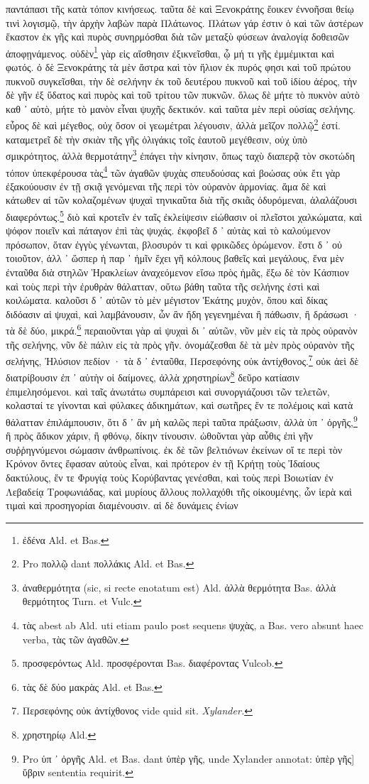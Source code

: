 \documentclass[a4paper, 11pt, oneside, polutonikogreek, german]{article}
\begin{document}
παντάπασι τῆς κατὰ τόπον κινήσεως. ταῦτα δὲ καὶ Ξενοκράτης ἔοικεν ἐννοῆσαι θείῳ τινὶ λογισμῷ, τὴν ἀρχὴν λαβὼν παρὰ Πλάτωνος. Πλάτων γάρ ἐστιν ὁ καὶ τῶν ἀστέρων ἕκαστον ἐκ γῆς καὶ πυρὸς συνηρμόσθαι διὰ τῶν μεταξὺ φύσεων ἀναλογίᾳ δοθεισῶν ἀποφῃνάμενος. οὐδὲν\footnote{ἐδένα Ald. et Bas.} γὰρ εἰς αἴσθησιν ἐξικνεῖσθαι, ᾧ μή τι γῆς ἐμμέμικται καὶ φωτός. ὁ δὲ Ξενοκράτης τὰ μὲν ἄστρα καὶ τὸν ἤλιον ἐκ πυρός φησι καὶ τοῦ πρώτου πυκνοῦ συγκεῖσθαι, τὴν δὲ σελήνην ἐκ τοῦ δευτέρου πυκνοῦ καὶ τοῦ ἰδίου ἀέρος, τὴν δὲ γῆν ἐξ ὕδατος καὶ πυρὸς καὶ τοῦ τρίτου τῶν πυκνῶν. ὅλως δὲ μήτε τὸ πυκνὸν αὐτὸ καθ ᾽ αὑτὸ, μήτε τὸ μανὸν εἶναι ψυχῆς δεκτικόν. καὶ ταῦτα μὲν περὶ οὐσίας σελήνης. εὖρος δὲ καὶ μέγεθος, οὐχ ὅσον οἱ γεωμέτραι λέγουσιν, ἀλλὰ μεῖζον πολλῷ\footnote{Pro πολλῷ dant πολλάκις Ald. et Bas.} ἐστί. καταμετρεῖ δὲ τὴν σκιὰν τῆς γῆς ὀλιγάκις τοῖς ἑαυτοῦ μεγέθεσιν, οὐχ ὑπὸ σμικρότητος, ἀλλὰ θερμοτάτην\footnote{ἀναθερμότητα (sic, si recte enotatum est) Ald. ἀλλὰ θερμότητα Bas. ἀλλὰ θερμότητος Turn. et Vulc.} ἐπάγει τὴν κίνησιν, ὅπως ταχὺ διαπερᾷ τὸν σκοτώδη τόπον ὑπεκφέρουσα τὰς\footnote{τὰς abest ab Ald. uti etiam paulo post sequens ψυχὰς, a Bas. vero absunt haec verba, τὰς τῶν ἀγαθῶν.} τῶν ἀγαθῶν ψυχὰς σπευδούσας καὶ βοώσας οὐκ ἔτι γὰρ ἐξακούουσιν ἐν τῇ σκιᾷ γενόμεναι τῆς περὶ τὸν οὐρανὸν ἁρμονίας. ἅμα δὲ καὶ κάτωθεν αἱ τῶν κολαζομένων ψυχαὶ τηνικαῦτα διὰ τῆς σκιᾶς ὀδυρόμεναι, ἀλαλάζουσι διαφερόντως.\footnote{προσφερόντως Ald. προσφέρονται Bas. διαφέροντας Vulcob.} διὸ καὶ κροτεῖν ἐν ταῖς ἐκλείψεσιν εἰώθασιν οἱ πλεῖστοι χαλκώματα, καὶ ψόφον ποιεῖν καὶ πάταγον ἐπὶ τὰς ψυχάς. ἐκφοβεῖ δ ᾽ αὐτὰς καὶ τὸ καλούμενον πρόσωπον, ὅταν ἐγγὺς γένωνται, βλοσυρόν τι καὶ φρικῶδες ὁρώμενον. ἔστι δ ᾽ οὐ τοιοῦτον, ἀλλ ᾽ ὥσπερ ἡ παρ ᾽ ἡμῖν ἔχει γῆ κόλπους βαθεῖς καὶ μεγάλους, ἕνα μὲν ἐνταῦθα διὰ στηλῶν Ἡρακλείων ἀναχεόμενον εἴσω πρὸς ἡμᾶς, ἔξω δὲ τὸν Κάσπιον καὶ τοὺς περὶ τὴν ἐρυθρὰν θάλατταν, οὕτω βάθη ταῦτα τῆς σελήνης ἐστὶ καὶ κοιλώματα. καλοῦσι δ ᾽ αὐτῶν τὸ μὲν μέγιστον Ἑκάτης μυχὸν, ὅπου καὶ δίκας διδόασιν αἱ ψυχαὶ, καὶ λαμβάνουσιν, ὧν ἂν ἤδη γεγενημέναι ἢ πάθωσιν, ἢ δράσωσι · τὰ δὲ δύο, μικρά.\footnote{τὰς δὲ δύο μακρὰς Ald. et Bas.} περαιοῦνται γὰρ αἱ ψυχαὶ δι ᾽ αὐτῶν, νῦν μὲν εἰς τὰ πρὸς οὐρανὸν τῆς σελήνης, νῦν δὲ πάλιν εἰς τὰ πρὸς γῆν. ὀνομάζεσθαι δὲ τὰ μὲν πρὸς οὐρανὸν τῆς σελήνης, Ἠλύσιον πεδίον · τὰ δ ᾽ ἐνταῦθα, Περσεφόνης οὐκ ἀντίχθονος.\footnote{Περσεφόνης οὐκ ἀντίχθονος vide quid sit. \emph{Xylander.}} οὐκ ἀεὶ δὲ διατρίβουσιν ἐπ ᾽ αὐτὴν οἱ δαίμονες, ἀλλὰ χρηστηρίων\footnote{χρηστηρίῳ Ald.} δεῦρο κατίασιν ἐπιμελησόμενοι. καὶ ταῖς ἀνωτάτω συμπάρεισι καὶ συνοργιάζουσι τῶν τελετῶν, κολασταί τε γίνονται καὶ φύλακες ἀδικημάτων, καὶ σωτῆρες ἔν τε πολέμοις καὶ κατὰ θάλατταν ἐπιλάμπουσιν, ὅτι δ ᾽ ἂν μὴ καλῶς περὶ ταῦτα πράξωσιν, ἀλλὰ ὑπ ᾽ ὀργῆς,\footnote{Pro ὑπ ᾽ ὀργῆς Ald. et Bas. dant ὑπὲρ γῆς, unde Xylander annotat: ὑπὲρ γῆς] ὕβριν sententia requirit.} ἢ πρὸς ἄδικον χάριν, ἢ φθόνῳ, δίκην τίνουσιν. ὠθοῦνται γὰρ αὖθις ἐπὶ γῆν συῤῥηγνύμενοι σώμασιν ἀνθρωπίνοις. ἐκ δὲ τῶν βελτιόνων ἐκείνων οἵ τε περὶ τὸν Κρόνον ὄντες ἔφασαν αὐτοὺς εἶναι, καὶ πρότερον ἐν τῇ Κρήτῃ τοὺς Ἰδαίους δακτύλους, ἔν τε Φρυγίᾳ τοὺς Κορύβαντας γενέσθαι, καὶ τοὺς περὶ Βοιωτίαν ἐν Λεβαδείᾳ Τροφωνιάδας, καὶ μυρίους ἄλλους πολλαχόθι τῆς οἰκουμένης, ὧν ἱερὰ καὶ τιμαὶ καὶ προσηγορίαι διαμένουσιν. αἱ δὲ δυνάμεις ἐνίων 
\end{document}
